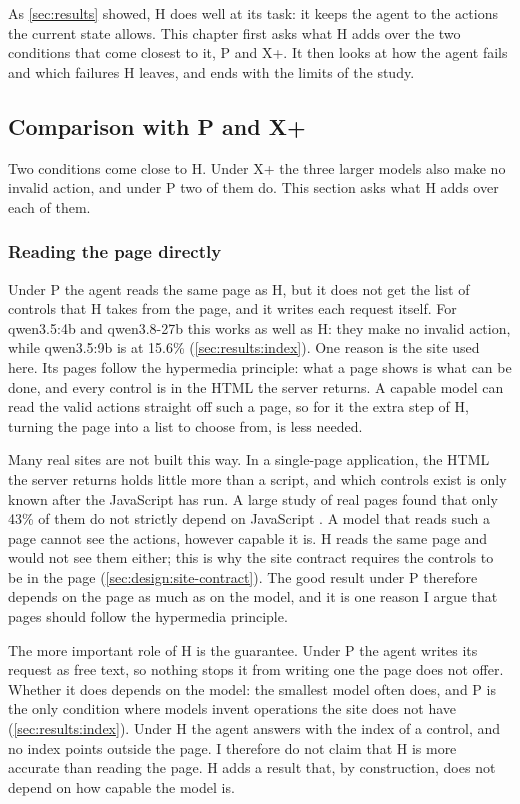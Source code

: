 As \autoref{sec:results} showed, H does well at its task: it keeps the agent to the actions the current state allows.
This chapter first asks what H adds over the two conditions that come closest to it, P and X+.
It then looks at how the agent fails and which failures H leaves, and ends with the limits of the study.

\subsection{Comparison with P and X+}\label{sec:disc:compare}

Two conditions come close to H.
Under X+ the three larger models also make no invalid action, and under P two of them do.
This section asks what H adds over each of them.

\subsubsection{Reading the page directly}\label{sec:disc:guarantee}

Under P the agent reads the same page as H, but it does not get the list of controls that H takes from the page, and it writes each request itself.
For qwen3.5:4b and qwen3.8-27b this works as well as H: they make no invalid action, while qwen3.5:9b is at 15.6\% (\autoref{sec:results:index}).
One reason is the site used here.
Its pages follow the hypermedia principle: what a page shows is what can be done, and every control is in the HTML the server returns.
A capable model can read the valid actions straight off such a page, so for it the extra step of H, turning the page into a list to choose from, is less needed.

Many real sites are not built this way.
In a single-page application, the HTML the server returns holds little more than a script, and which controls exist is only known after the JavaScript has run.
A large study of real pages found that only 43\% of them do not strictly depend on JavaScript \cite{fouquet2023breaking}.
A model that reads such a page cannot see the actions, however capable it is.
H reads the same page and would not see them either; this is why the site contract requires the controls to be in the page (\autoref{sec:design:site-contract}).
The good result under P therefore depends on the page as much as on the model, and it is one reason I argue that pages should follow the hypermedia principle.


The more important role of H is the guarantee.
Under P the agent writes its request as free text, so nothing stops it from writing one the page does not offer.
Whether it does depends on the model: the smallest model often does, and P is the only condition where models invent operations the site does not have (\autoref{sec:results:index}).
Under H the agent answers with the index of a control, and no index points outside the page.
I therefore do not claim that H is more accurate than reading the page.
H adds a result that, by construction, does not depend on how capable the model is.


